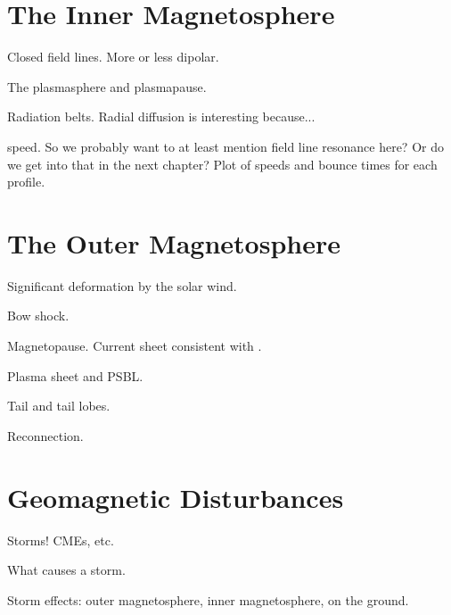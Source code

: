 \section{The Inner Magnetosphere}

Closed field lines. More or less dipolar. 

The plasmasphere and plasmapause. 

Radiation belts. Radial diffusion is interesting because... 

\Alfven speed. So we probably want to at least mention field line resonance here? Or do we get into that in the next chapter? Plot of \Alfven speeds and \Alfven bounce times for each profile. 

\section{The Outer Magnetosphere}

Significant deformation by the solar wind. 

Bow shock. 

Magnetopause. Current sheet consistent with \amplaw. 

Plasma sheet and PSBL. 

Tail and tail lobes. 

Reconnection. 

\section{Geomagnetic Disturbances}

Storms! CMEs, etc. 

What causes a storm. 

Storm effects: outer magnetosphere, inner magnetosphere, on the ground.













